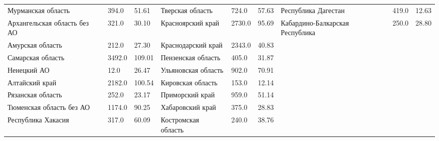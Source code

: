 \begin{landscape}
\begin{table}[]
{\begin{tabular}{|l|l|l|l|l|l|l|l|l|}
				Мурманская область                & 394.0  & 51.61  & Тверская область                & 724.0  & 57.63  & Республика Дагестан          & 419.0  & 12.63  \\
				Архангельская область без АО &
				321.0 &
				30.10 &
				Красноярский край &
				2730.0 &
				95.69 &
				Кабардино-Балкарская Республика &
				250.0 &
				28.80 \\
				Амурская область                  & 212.0  & 27.30  & Краснодарский край              & 2343.0 & 40.83  &                              &        &        \\
				Самарская область                 & 3492.0 & 109.01 & Пензенская область              & 405.0  & 31.87  &                              &        &        \\
				Ненецкий АО                       & 12.0   & 26.47  & Ульяновская область             & 902.0  & 70.91  &                              &        &        \\
				Алтайский край                    & 2182.0 & 100.54 & Кировская область               & 153.0  & 12.14  &                              &        &        \\
				Рязанская область                 & 252.0  & 23.17  & Приморский край                 & 959.0  & 51.14  &                              &        &        \\
				Тюменская область без АО          & 1174.0 & 90.25  & Хабаровский край                & 375.0  & 28.83  &                              &        &        \\
				Республика Хакасия                & 317.0  & 60.09  & Костромская область             & 240.0  & 38.76  &                              &        &        \\ \hline
			\end{tabular}%
		}
	\end{table}
\end{landscape}



\endinput